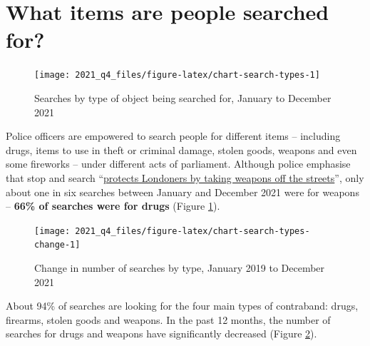 \documentclass[
  a4paper,
  twoside, 11pt]{article}
\begin{document}
\hypertarget{what-items-are-people-searched-for}{%
\section{What items are people searched for?}\label{what-items-are-people-searched-for}}



\begin{figure}[tb]

{\centering \texttt{[image: 2021\_q4\_files/figure-latex/chart-search-types-1]} 

}

\caption{Searches by type of object being searched for, January to December 2021}\label{fig:chart-search-types}
\end{figure}

Police officers are empowered to search people for different items -- including drugs, items to use in theft or criminal damage, stolen goods, weapons and even some fireworks -- under different acts of parliament. Although police emphasise that stop and search ``\href{https://www.met.police.uk/police-forces/metropolitan-police/areas/about-us/about-the-met/stop-and-search/}{protects Londoners by taking weapons off the streets}'', only about one in six searches between January and December 2021 were for weapons -- \textbf{66\% of searches were for drugs} (Figure \ref{fig:chart-search-types}).



\begin{figure}[bh]

{\centering \texttt{[image: 2021\_q4\_files/figure-latex/chart-search-types-change-1]} 

}

\caption{Change in number of searches by type, January 2019 to December 2021}\label{fig:chart-search-types-change}
\end{figure}

About 94\% of searches are looking for the four main types of contraband: drugs, firearms, stolen goods and weapons. In the past 12 months, the number of searches for drugs and weapons have significantly decreased (Figure \ref{fig:chart-search-types-change}).
\end{document}
